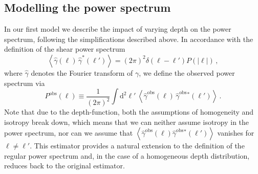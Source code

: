 \documentclass{aa}
\renewcommand{\rm}{\mathrm}
\def\b#1{\bm{#1}}
\def\la{\left<}
\def\ra{\right>}
\def\gammaoh{\hat{\gamma}^{\text{obs}}}
\def\d{\rm{d}}
\begin{document}
\subsection{Modelling the power spectrum}
\label{sec:modelling_power_spectrum}
In our first model we describe the impact of varying depth on the power spectrum, following the simplifications described above.
%
%
In accordance with the definition of the shear power spectrum \begin{equation}
\la \hat{\gamma}(\b\ell)\,\hat{\gamma}^*(\b\ell')\ra = (2\pi)^2\delta(\b\ell-\b\ell')P(|\b\ell|) \, ,
\label{eq:original_power_spectrum}
\end{equation}
where $\hat{\gamma}$ denotes the Fourier transform of $\gamma$, we define the observed power spectrum via \begin{equation}
P^{\text{obs}}(\b\ell) \equiv \frac{1}{(2\pi)^2}\int \d^2 \ell'\,  \la \gammaoh(\b \ell)\, \gammaoh {}^*(\b \ell')\ra \, .
\end{equation}
Note that due to the depth-function, both the assumptions of homogeneity and isotropy break down, which means that we can neither assume isotropy in the power spectrum, nor can we assume that $\la \gammaoh(\b \ell) \gammaoh {}^*(\b \ell')\ra$ vanishes for $\b\ell\neq\b\ell'$. This estimator provides a natural extension to the definition of the regular power spectrum and, in the case of a homogeneous depth distribution, reduces back to the original estimator.
\end{document}
